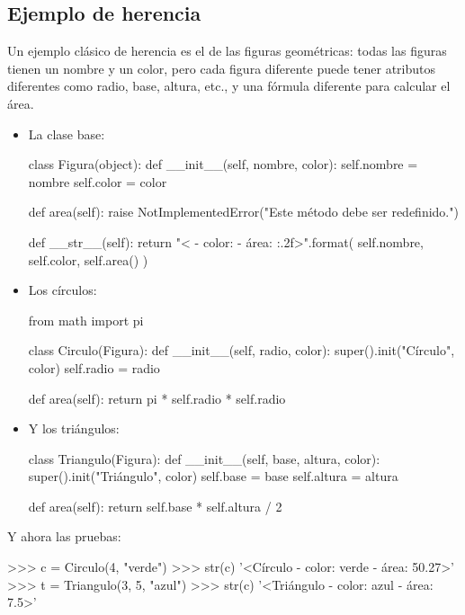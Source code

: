 \subsection*{Ejemplo de herencia}

Un ejemplo clásico de herencia es el de las figuras geométricas: todas las
figuras tienen un nombre y un color, pero cada figura diferente puede tener
atributos diferentes como radio, base, altura, etc., y una fórmula diferente
para calcular el área.

\begin{itemize}
\item La clase base:

\begin{codigo-python-sn}
class Figura(object):
    def __init__(self, nombre, color):
        self.nombre = nombre
        self.color = color

    def area(self):
        raise NotImplementedError("Este método debe ser redefinido.")

    def __str__(self):
        return "<{} - color: {} - área: {:.2f}>".format(
            self.nombre, self.color, self.area()
        )
\end{codigo-python-sn}

\item Los círculos:

\begin{codigo-python-sn}
from math import pi

class Circulo(Figura):
    def __init__(self, radio, color):
        super().init("Círculo", color)
        self.radio = radio

    def area(self):
        return pi * self.radio * self.radio
\end{codigo-python-sn}

\item Y los triángulos:

\begin{codigo-python-sn}
class Triangulo(Figura):
    def __init__(self, base, altura, color):
        super().init("Triángulo", color)
        self.base = base
        self.altura = altura

    def area(self):
        return self.base * self.altura / 2
\end{codigo-python-sn}

\end{itemize}

Y ahora las pruebas:

\begin{codigo-python-sn}
>>> c = Circulo(4, "verde")
>>> str(c)
'<Círculo - color: verde - área: 50.27>'
>>> t = Triangulo(3, 5, "azul")
>>> str(c)
'<Triángulo - color: azul - área: 7.5>'
\end{codigo-python-sn}

